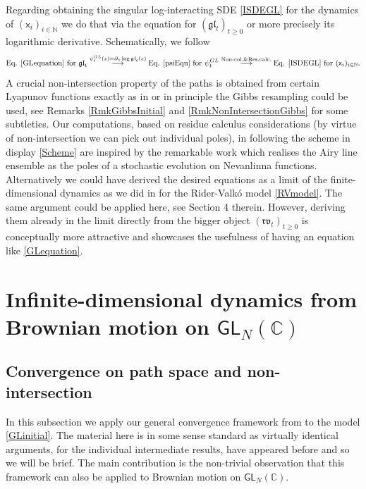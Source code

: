 \documentclass[]{article}
\begin{document}
Regarding obtaining the singular log-interacting SDE \eqref{ISDEGL} for the dynamics of $(\mathsf{x}_i)_{i\in \mathbb{N}}$ we do that via the equation for $(\mathfrak{gl}_t)_{t\ge 0}$ or more precisely its logarithmic derivative. Schematically, we follow
\begin{equation}\label{Scheme}
\textnormal{Eq. } \eqref{GLequation} \textnormal{ for } \mathfrak{gl}_t \overset{\psi^{GL}_t(z)=\partial_z\log \mathfrak{gl}_t(z)}{\longrightarrow} \textnormal{Eq. } \eqref{psiEqu} \textnormal{ for } \mathfrak{\psi}_t^{GL}  \overset{\textnormal{Non-col.} \& \textnormal{Res.calc.}}{\longrightarrow} \textnormal{Eq. } \eqref{ISDEGL} \textnormal{ for } (\mathsf{x}_i)_{i\in \mathbb{N}}.
\end{equation}
A crucial non-intersection property of the paths is obtained from certain Lyapunov functions exactly as in \cite{AM24} or in principle the Gibbs resampling could be used, see Remarks \ref{RmkGibbsInitial} and \ref{RmkNonIntersectionGibbs} for some subtleties. Our computations, based on residue calculus considerations (by virtue of non-intersection we can pick out individual poles), in following the scheme in display \eqref{Scheme} are inspired by the remarkable work \cite{HuangZhang} which realises the Airy line ensemble \cite{CorwinHammond1} as the poles of a stochastic evolution on Nevanlinna functions. Alternatively we could have derived the desired equations as a limit of the finite-dimensional dynamics as we did in \cite{AM24} for the Rider-Valk\'{o} model \eqref{RVmodel}. The same argument could be applied here, see Section 4 therein. However, deriving them already in the limit directly from the bigger object $(\mathfrak{rv}_t)_{t\ge 0}$  is conceptually more attractive and showcases the usefulness of having an equation like \eqref{GLequation}.  

\section{Infinite-dimensional dynamics from Brownian motion on $\mathsf{GL}_N(\mathbb{C})$}

\subsection{Convergence on path space and non-intersection} \label{SubsectionConvPathSpace}

In this subsection we apply our general convergence framework from \cite{AM24} to the model \eqref{GLinitial}. The material here is in some sense standard as virtually identical arguments, for the individual intermediate results, have appeared before and so we will be brief. The main contribution is the non-trivial observation that this framework can also be applied to Brownian motion on $\mathsf{GL}_N(\mathbb{C})$.
\end{document}
